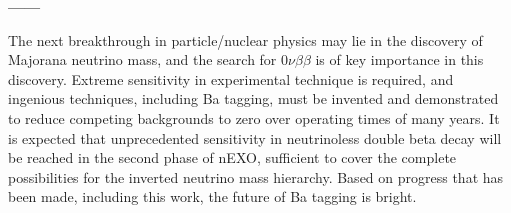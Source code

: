 \vspace{10mm}

\begin{center}
\textbf{------}
\end{center}

The next breakthrough in particle/nuclear physics may lie in the discovery of Majorana neutrino mass, and the search for $0\nu\beta\beta$ is of key importance in this discovery.  Extreme sensitivity in experimental technique is required, and ingenious techniques, including Ba tagging, must be invented and demonstrated to reduce competing backgrounds to zero over operating times of many years.  It is expected that unprecedented sensitivity in neutrinoless double beta decay will be reached in the second phase of nEXO, sufficient to cover the complete possibilities for the inverted neutrino mass hierarchy.  Based on progress that has been made, including this work, the future of Ba tagging is bright.
